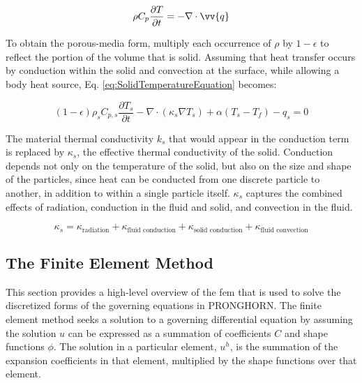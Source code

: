 \documentclass[10pt]{article}
\numberwithin{equation}{section} %
\begin{document}
\begin{equation}
\label{eq:SolidTemperatureEquation}
\rho C_p\frac{\partial T}{\partial t}=-\nabla\cdot\vv{q}\\
\end{equation}

To obtain the porous-media form, multiply each occurrence of \(\rho\) by \(1-\epsilon\) to reflect the portion of the volume that is solid. Assuming that heat transfer occurs by conduction within the solid and convection at the surface, while allowing a body heat source, Eq. \eqref{eq:SolidTemperatureEquation} becomes:

\begin{equation}
\label{eq:SolidPorous}
(1-\epsilon)\rho_sC_{p,s}\frac{\partial T_s}{\partial t}-\nabla\cdot(\kappa_s\nabla T_s)+\alpha(T_s-T_f)-q_s=0
\end{equation}

The material thermal conductivity \(k_s\) that would appear in the conduction term is replaced by \(\kappa_s\), the effective thermal conductivity of the solid. Conduction depends not only on the temperature of the solid, but also on the size and shape of the particles, since heat can be conducted from one discrete particle to another, in addition to within a single particle itself. \(\kappa_s\) captures the combined effects of radiation, conduction in the fluid and solid, and convection in the fluid. 

\begin{equation}
\label{eq:Kappa}
\kappa_s=\kappa_{\textrm{radiation}}+\kappa_{\textrm{fluid conduction}}+\kappa_{\textrm{solid conduction}}+\kappa_{\textrm{fluid convection}}
\end{equation}

\subsection{The Finite Element Method}
\label{sec:FEM}

This section provides a high-level overview of the \gls{fem} that is used to solve the discretized forms of the governing equations in PRONGHORN. The finite element method seeks a solution to a governing differential equation by assuming the solution \(u\) can be expressed as a summation of coefficients \(C\) and shape functions \(\phi\). The solution in a particular element, \(u^h\), is the summation of the expansion coefficients in that element, multiplied by the shape functions over that element. 
\end{document}
